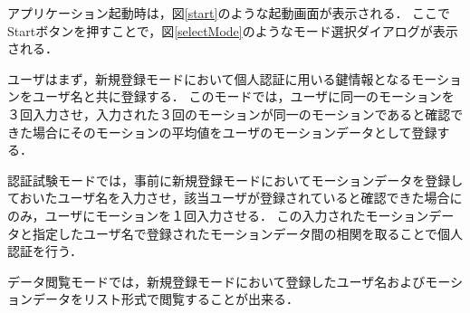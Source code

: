 \documentclass[11pt]{jreport}
\begin{document}
    アプリケーション起動時は，図\ref{start}のような起動画面が表示される．
    ここでStartボタンを押すことで，図\ref{selectMode}のようなモード選択ダイアログが表示される．

    ユーザはまず，新規登録モードにおいて個人認証に用いる鍵情報となるモーションをユーザ名と共に登録する．
    このモードでは，ユーザに同一のモーションを３回入力させ，入力された３回のモーションが同一のモーションであると確認できた場合にそのモーションの平均値をユーザのモーションデータとして登録する．

    認証試験モードでは，事前に新規登録モードにおいてモーションデータを登録しておいたユーザ名を入力させ，該当ユーザが登録されていると確認できた場合にのみ，ユーザにモーションを１回入力させる．
    この入力されたモーションデータと指定したユーザ名で登録されたモーションデータ間の相関を取ることで個人認証を行う．

    データ閲覧モードでは，新規登録モードにおいて登録したユーザ名およびモーションデータをリスト形式で閲覧することが出来る．
\end{document}
